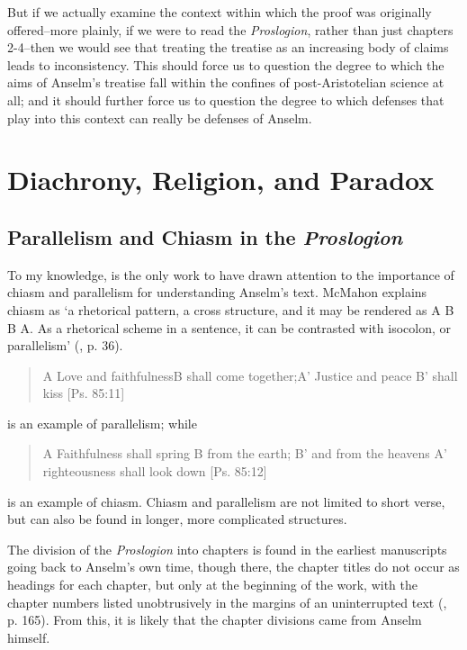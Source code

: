\documentclass[]{birkjour}
\begin{document}
But if we actually examine the context within which the proof was originally offered--more plainly, if we were to read the \textit{Proslogion}, rather than just chapters 2-4--then we would see that treating the treatise as an increasing body of claims leads to inconsistency. This should force us to question the degree to which the aims of Anselm's treatise fall within the confines of post-Aristotelian science at all; and it should further force us to question the degree to which defenses that play into this context can really be defenses of Anselm.
	
\section{Diachrony, Religion, and Paradox}
\subsection{Parallelism and Chiasm in the \textit{Proslogion}}
To my knowledge, \cite{McMahon2004} is the only work to have drawn attention to the importance of chiasm and parallelism for understanding Anselm's text. McMahon explains chiasm as `a rhetorical pattern, a cross structure, and it may be rendered as A B B A. As a rhetorical scheme in a sentence, it can be contrasted with isocolon, or parallelism' (\cite{McMahon2004}, p. 36). 
\begin{quote}
A Love and faithfulness\newline B \hspace{.3in} shall come together;\newline A' Justice and peace \newline B' \hspace{.3in} shall kiss [Ps. 85:11]
\end{quote}
is an example of parallelism; while 
\begin{quote}
A Faithfulness shall spring \newline B \hspace{.3in} from the earth; \newline B' \hspace {.3in} and from the heavens \newline A' righteousness shall look down [Ps. 85:12]
\end{quote}
is an example of chiasm. Chiasm and parallelism are not limited to short verse, but can also be found in longer, more complicated structures.
	
The division of the \textit{Proslogion} into chapters is found in the earliest manuscripts going back to Anselm's own time, though there, the chapter titles do not occur as headings for each chapter, but only at the beginning of the work, with the chapter numbers listed unobtrusively in the margins of an uninterrupted text (\cite{McMahon2004}, p. 165). From this, it is likely that the chapter divisions came from Anselm himself.
	
\end{document}
